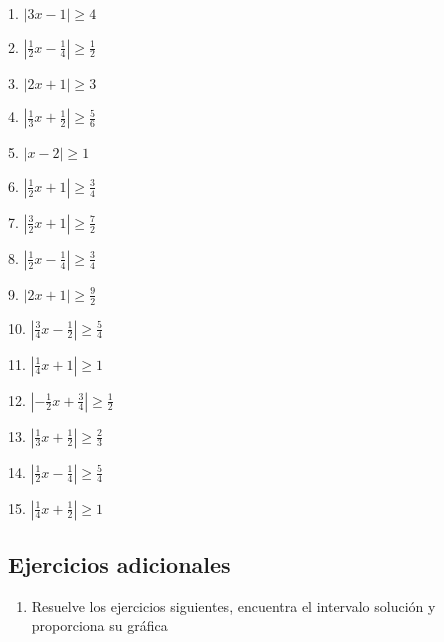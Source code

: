 \documentclass[]{book}
\providecommand{\tightlist}{%
  \setlength{\itemsep}{0pt}\setlength{\parskip}{0pt}}
\begin{document}
\begin{multicols}{3}
1. $|3x-1|\geq 4$

2. $|\frac{1}{2}x-\frac{1}{4}|\geq\frac{1}{2}$

3. $|2x+1|\geq 3$

4. $|\frac{1}{3}x+\frac{1}{2}|\geq\frac{5}{6}$

5. $|x-2|\geq 1$

6. $|\frac{1}{2}x+1|\geq\frac{3}{4}$

7. $|\frac{3}{2}x+1|\geq\frac{7}{2}$

8. $|\frac{1}{2}x-\frac{1}{4}|\geq\frac{3}{4}$

9. $|2x+1|\geq\frac{9}{2}$

10. $|\frac{3}{4}x-\frac{1}{2}|\geq\frac{5}{4}$

11. $|\frac{1}{4}x+1|\geq 1$

12. $|-\frac{1}{2}x+\frac{3}{4}|\geq\frac{1}{2}$

13. $|\frac{1}{3}x+\frac{1}{2}|\geq\frac{2}{3}$

14. $|\frac{1}{2}x-\frac{1}{4}|\geq\frac{5}{4}$

15. $|\frac{1}{4}x+\frac{1}{2}|\geq 1$
\end{multicols}

\subsection{Ejercicios adicionales}\label{ejercicios-adicionales}

\begin{enumerate}
\def\labelenumi{\arabic{enumi}.}
\tightlist
\item
  Resuelve los ejercicios siguientes, encuentra el intervalo solución y
  proporciona su gráfica
\end{enumerate}
\end{document}
